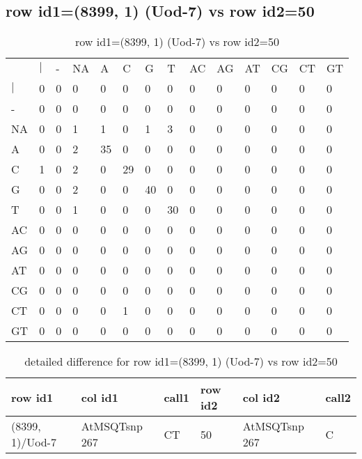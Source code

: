 \subsection{row id1=(8399, 1) (Uod-7) vs row id2=50}
\begin{center}
\begin{longtable}{|l|l|l|l|l|l|l|l|l|l|l|l|l|l|}
\caption{row id1=(8399, 1) (Uod-7) vs row id2=50} \label{table_dm654}\\
\hline
\\
\hline
&$|$&-&NA&A&C&G&T&AC&AG&AT&CG&CT&GT\\
$|$&0&0&0&0&0&0&0&0&0&0&0&0&0\\
-&0&0&0&0&0&0&0&0&0&0&0&0&0\\
NA&0&0&1&1&0&1&3&0&0&0&0&0&0\\
A&0&0&2&35&0&0&0&0&0&0&0&0&0\\
C&1&0&2&0&29&0&0&0&0&0&0&0&0\\
G&0&0&2&0&0&40&0&0&0&0&0&0&0\\
T&0&0&1&0&0&0&30&0&0&0&0&0&0\\
AC&0&0&0&0&0&0&0&0&0&0&0&0&0\\
AG&0&0&0&0&0&0&0&0&0&0&0&0&0\\
AT&0&0&0&0&0&0&0&0&0&0&0&0&0\\
CG&0&0&0&0&0&0&0&0&0&0&0&0&0\\
CT&0&0&0&0&1&0&0&0&0&0&0&0&0\\
GT&0&0&0&0&0&0&0&0&0&0&0&0&0\\
\hline
\end{longtable}
\end{center}

\begin{center}
\begin{longtable}{|l|l|l|l|l|l|}
\caption{detailed difference for row id1=(8399, 1) (Uod-7) vs row id2=50} \label{table_dm655}\\
\hline
row id1&col id1&call1&row id2&col id2&call2\\
\hline
(8399, 1)/Uod-7&AtMSQTsnp 267&CT&50&AtMSQTsnp 267&C\\
\hline
\end{longtable}
\end{center}

